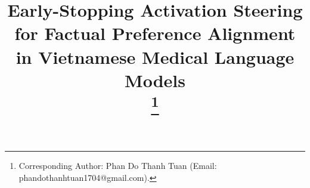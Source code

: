 \usepackage[utf8]{inputenc}
\usepackage[T5,T1]{fontenc}
\usepackage[vietnamese,english]{babel}
\usepackage{listings}
\usepackage{cite}
\usepackage{amsmath,amssymb,amsfonts}
\usepackage{algorithmic}
\usepackage{graphicx}
\usepackage{textcomp}
\usepackage{xcolor}
\usepackage{booktabs}
\usepackage{multirow}
\usepackage{url}

\def\BibTeX{{\rm B\kern-.05em{\sc i\kern-.025em b}\kern-.08em
    T\kern-.1667em\lower.7ex\hbox{E}\kern-.125emX}}



\title{Early-Stopping Activation Steering for Factual Preference Alignment in Vietnamese Medical Language Models\\
\thanks{Corresponding Author: Phan Do Thanh Tuan (Email: phandothanhtuan1704@gmail.com).}
}

\author{
}

\maketitle

